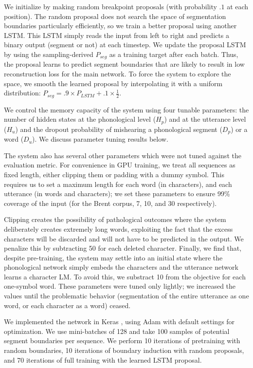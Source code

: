 \documentclass[11pt,letterpaper]{article}
\begin{document}
We initialize by making random breakpoint proposals (with probability
$.1$ at each position). The random proposal does not search the space
of segmentation boundaries particularly efficiently, so we train a
better proposal using another LSTM. This LSTM simply reads the input
from left to right and predicts a binary output (segment or not) at
each timestep. We update the proposal LSTM by using the
sampling-derived $P_{seg}$ as a training target after each
batch. Thus, the proposal learns to predict segment boundaries that
are likely to result in low reconstruction loss for the main
network. To force the system to explore the space, we smooth the
learned proposal by interpolating it with a uniform distribution:
$P_{seg} = .9 \times P_{LSTM} + .1 \times \frac{1}{2}$.

We control the memory capacity of the system using four tunable
parameters: the number of hidden states at the phonological level
($H_p$) and at the utterance level ($H_u$) and the dropout probability
of mishearing a phonological segment ($D_p$) or a word ($D_u$). We
discuss parameter tuning results below.

The system also has several other parameters which were not tuned
against the evaluation metric. For convenience in GPU training, we
treat all sequences as fixed length, either clipping them or padding
with a dummy symbol. This requires us to set a maximum length for each
word (in characters), and each utterance (in words and characters); we
set these parameters to ensure 99\% coverage of the input (for the
Brent corpus, 7, 10, and 30 respectively).

Clipping creates the possibility of pathological outcomes where the
system deliberately creates extremely long words, exploiting the fact
that the excess characters will be discarded and will not have to be
predicted in the output. We penalize this by subtracting 50 for each
deleted character. Finally, we find that, despite pre-training, the
system may settle into an initial state where the phonological network
simply embeds the characters and the utterance network learns a
character LM. To avoid this, we substract 10 from the objective for
each one-symbol word. These parameters were tuned only lightly; we
increased the values until the problematic behavior (segmentation of
the entire utterance as one word, or each character as a word) ceased.

We implemented the network in Keras \cite{Keras}, using Adam \cite{Kingma14}
with default settings for optimization. We use mini-batches of 128 and
take 100 samples of potential segment boundaries per sequence. We
perform 10 iterations of pretraining with random boundaries, 10
iterations of boundary induction with random proposals, and 70
iterations of full training with the learned LSTM proposal.
\end{document}
